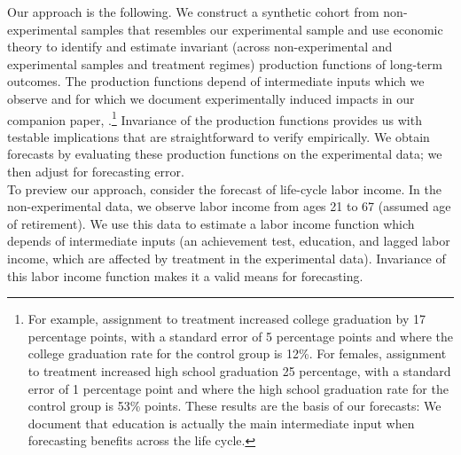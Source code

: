 \noindent Our approach is the following. We construct a synthetic cohort from non-experimental samples that resembles our experimental sample and use economic theory to identify and estimate invariant (across non-experimental and experimental samples and treatment regimes) production functions of long-term outcomes. The production functions depend of intermediate inputs which we observe and for which we document experimentally induced impacts in our companion paper, \citet{Garcia_Heckman_Ziff_2017_Gender-Diff_UNPUBLISHED}.\footnote{For example, assignment to treatment increased college graduation by 17 percentage points, with a standard error of 5 percentage points and where the college graduation rate for the control group is 12\%. For females, assignment to treatment increased high school graduation 25 percentage, with a standard error of 1 percentage point and where the high school  graduation rate for the control group is 53\% points. These results are the basis of our forecasts: We document that education is actually the main intermediate input when forecasting benefits across the life cycle.} Invariance of the production functions provides us with testable implications that are straightforward to verify empirically. We obtain forecasts by evaluating these production functions on the experimental data; we then adjust for forecasting error.\\

\noindent To preview our approach, consider the forecast of life-cycle labor income. In the non-experimental data, we observe labor income from ages 21 to 67 (assumed age of retirement). We use this data to estimate a labor income function which depends of intermediate inputs (an achievement test, education, and lagged labor income, which are affected by treatment in the experimental data). Invariance of this labor income function makes it a valid means for forecasting.\\ 

